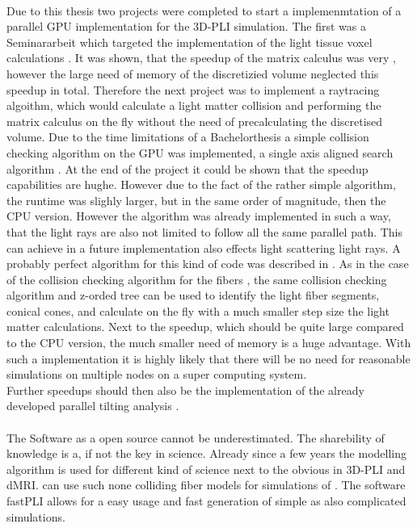\paragraph{}
\dummy{}
\par
Due to this thesis two projects were completed to start a implemenmtation of a parallel \ac{GPU} implementation for the \ac{3D-PLI} simulation.
The first was a Seminararbeit \cite{Kobusch:Seminar} which targeted the implementation of the light tissue voxel calculations \dummy{}.
It was shown, that the speedup of the matrix calculus was very \dummy{}, however the large need of memory of the discretizied volume neglected this speedup in total.
Therefore the next project \cite{Kobusch:887783} was to implement a raytracing algoithm, which would calculate a light matter collision and performing the matrix calculus on the fly without the need of precalculating the discretised volume.
Due to the time limitations of a Bachelorthesis a simple collision checking algorithm on the \ac{GPU} was implemented, a single axis aligned search algorithm \cite{Karras2012}.
At the end of the project it could be shown that the speedup capabilities are hughe.
However due to the fact of the rather simple algorithm, the runtime was slighly larger, but in the same order of magnitude, then the \ac{CPU} version.
However the algorithm was already implemented in such a way, that the light rays are also not limited to follow all the same parallel path.
This can achieve in a future implementation also effects light scattering light rays.
A probably perfect algorithm for this kind of code was described in \cite{Karras2012}.
As in the case of the collision checking algorithm for the fibers \dummy{}, the same collision checking algorithm and z-orded tree can be used to identify the light fiber segments, \ie{} conical cones, and calculate on the fly with a much smaller step size the light matter calculations.
Next to the speedup, which should be quite large compared to the \ac{CPU} version, the much smaller need of memory is a huge advantage.
With such a implementation it is highly likely that there will be no need for reasonable simulations on multiple nodes on a super computing system.
\\
% 
Further speedups should then also be the implementation of the already developed parallel tilting analysis \dummy{}.
%
% 
% 
\paragraph{}
% 
The Software as a open source cannot be underestimated.
The sharebility of knowledge is a, if not the key in science.
Already since a few years the modelling algorithm is used for different kind of science next to the obvious in \ac{3D-PLI} and \ac{dMRI}.
\cite{Ji2021} can use such none colliding fiber models for simulations of \dummy{}.
The software \ac{fastPLI} allows for a easy usage and fast generation of simple as also complicated simulations.
% 
% 
% 

